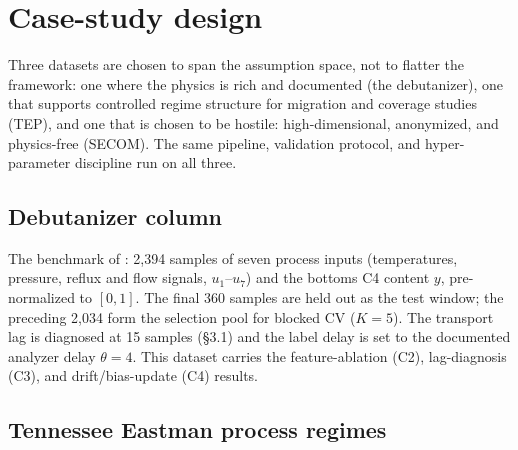 \section{Case-study design}
\label{sec:case_studies}

Three datasets are chosen to span the assumption space, not to flatter the framework:
one where the physics is rich and documented (the debutanizer), one that supports
controlled regime structure for migration and coverage studies (TEP), and one that is
chosen to be hostile: high-dimensional, anonymized, and physics-free (SECOM). The same
pipeline, validation protocol, and hyper-parameter discipline run on all three.

\subsection{Debutanizer column}

The benchmark of \citep{fortuna2007}: 2,394 samples of seven process inputs
(temperatures, pressure, reflux and flow signals, \(u_1\)--\(u_7\)) and the bottoms C4
content \(y\), pre-normalized to \([0,1]\). The final 360 samples are held out as the test
window; the preceding 2,034 form the selection pool for blocked CV (\(K = 5\)). The
transport lag is diagnosed at 15 samples (\S 3.1) and the label delay is set to the
documented analyzer delay \(\theta = 4\). This dataset carries the feature-ablation
(C2), lag-diagnosis (C3), and drift/bias-update (C4) results.

\subsection{Tennessee Eastman process regimes}

